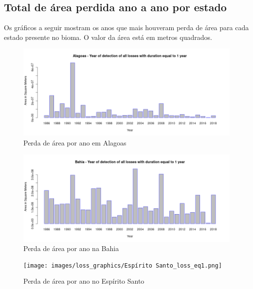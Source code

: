 \begin{appendices}
\section{Total de área perdida ano a ano por estado}

\hspace{13pt} Os gráficos a seguir mostram os anos que mais houveram perda de área para cada estado presente no bioma. O valor da área está em metros quadrados.

\begin{figure}[H]
    \centering
    \includegraphics[scale=.5]{images/loss_graphics/Alagoas_loss_eq1.png}
    \caption{Perda de área por ano em Alagoas}
    \label{fig:loss_alagoas}
\end{figure}

\begin{figure}[H]
    \centering
    \includegraphics[scale=.5]{images/loss_graphics/Bahia_loss_eq1.png}
    \caption{Perda de área por ano na Bahia}
    \label{fig:loss_bahia}
\end{figure}

\begin{figure}[H]
    \centering
    \texttt{[image: images/loss\_graphics/Espírito Santo\_loss\_eq1.png]}
    \caption{Perda de área por ano no Espírito Santo}
    \label{fig:loss_espirito_santo}
\end{figure}


\end{appendices}
